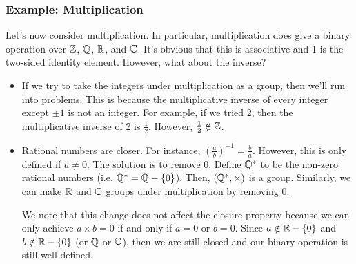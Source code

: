 \documentclass[letterpaper]{article}
\begin{document}
\subsubsection{Example: Multiplication}
Let's now consider multiplication. In particular, multiplication does give a binary operation over $\mathbb{Z}$, $\mathbb{Q}$, $\mathbb{R}$, and $\mathbb{C}$. It's obvious that this is associative and 1 is the two-sided identity element. However, what about the inverse? 
\begin{itemize}
    \item If we try to take the integers under multiplication as a group, then we'll run into problems. This is because the multiplicative inverse of every \underline{integer} except $\pm 1$ is not an integer. For example, if we tried 2, then the multiplicative inverse of 2 is $\frac{1}{2}$. However, $\frac{1}{2} \notin \mathbb{Z}$. 
    
    \item Rational numbers are closer. For instance, $\left(\frac{a}{b}\right)^{-1} = \frac{b}{a}$. However, this is only defined if $a \neq 0$. The solution is to remove 0. Define $\mathbb{Q}^*$ to be the non-zero rational numbers (i.e. $\mathbb{Q}^* = \mathbb{Q} - \{0\}$). Then, $(\mathbb{Q}^*, \times)$ is a group. Similarly, we can make $\mathbb{R}$ and $\mathbb{C}$ groups under multiplication by removing 0. 
    
    \bigskip 

    We note that this change does not affect the closure property because we can only achieve $a \times b = 0$ if and only if $a = 0$ or $b = 0$. Since $a \notin \mathbb{R} - \{0\}$ and $b \notin \mathbb{R} - \{0\}$ (or $\mathbb{Q}$ or $\mathbb{C}$), then we are still closed and our binary operation is still well-defined. 
\end{itemize}
\end{document}
